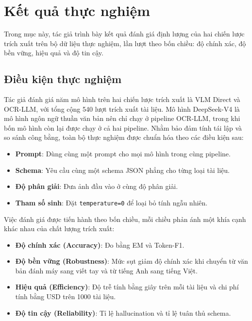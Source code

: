 ﻿\documentclass[12pt]{report}
\begin{document}
\section{Kết quả thực nghiệm}\label{sec:results}

Trong mục này, tác giả trình bày kết quả đánh giá định lượng của hai chiến lược trích xuất trên bộ dữ liệu thực nghiệm, lần lượt theo bốn chiều: độ chính xác, độ bền vững, hiệu quả và độ tin cậy.

\subsection{Điều kiện thực nghiệm}\label{sec:experiment_setup}

Tác giả đánh giá năm mô hình trên hai chiến lược trích xuất là VLM Direct và OCR-LLM, với tổng cộng 540 lượt trích xuất tài liệu. Mô hình DeepSeek-V4 là mô hình ngôn ngữ thuần văn bản nên chỉ chạy ở pipeline OCR-LLM, trong khi bốn mô hình còn lại được chạy ở cả hai pipeline. Nhằm bảo đảm tính tái lập và so sánh công bằng, toàn bộ thực nghiệm được chuẩn hóa theo các điều kiện sau:

\begin{itemize}
    \item \textbf{Prompt}: Dùng cùng một prompt cho mọi mô hình trong cùng pipeline.
    \item \textbf{Schema}: Yêu cầu cùng một schema JSON phẳng cho từng loại tài liệu.
    \item \textbf{Độ phân giải}: Đưa ảnh đầu vào ở cùng độ phân giải.
    \item \textbf{Tham số sinh}: Đặt \texttt{temperature=0} để loại bỏ tính ngẫu nhiên.
\end{itemize}

Việc đánh giá được tiến hành theo bốn chiều, mỗi chiều phản ánh một khía cạnh khác nhau của chất lượng trích xuất:

\begin{itemize}
    \item \textbf{Độ chính xác (Accuracy)}: Đo bằng EM và Token-F1.
    \item \textbf{Độ bền vững (Robustness)}: Mức sụt giảm độ chính xác khi chuyển từ văn bản đánh máy sang viết tay và từ tiếng Anh sang tiếng Việt.
    \item \textbf{Hiệu quả (Efficiency)}: Độ trễ tính bằng giây trên mỗi tài liệu và chi phí tính bằng USD trên 1000 tài liệu.
    \item \textbf{Độ tin cậy (Reliability)}: Tỉ lệ hallucination và tỉ lệ tuân thủ schema.
\end{itemize}
\end{document}
